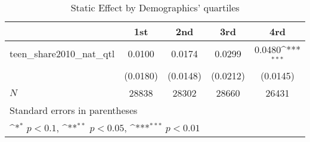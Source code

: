 \begin{table}[htbp]\centering
\def\sym#1{\ifmmode^{#1}\else\(^{#1}\)\fi}
\caption{Static Effect by Demographics' quartiles}
\begin{tabular}{l*{4}{c}}
\hline\hline
            &\multicolumn{1}{c}{1st}&\multicolumn{1}{c}{2nd}&\multicolumn{1}{c}{3rd}&\multicolumn{1}{c}{4rd}\\
\hline
teen\_share2010\_nat\_qtl&      0.0100         &      0.0174         &      0.0299         &      0.0480\sym{***}\\
            &    (0.0180)         &    (0.0148)         &    (0.0212)         &    (0.0145)         \\
\hline
\(N\)       &       28838         &       28302         &       28660         &       26431         \\
\hline\hline
\multicolumn{5}{l}{\footnotesize Standard errors in parentheses}\\
\multicolumn{5}{l}{\footnotesize \sym{*} \(p<0.1\), \sym{**} \(p<0.05\), \sym{***} \(p<0.01\)}\\
\end{tabular}
\end{table}
